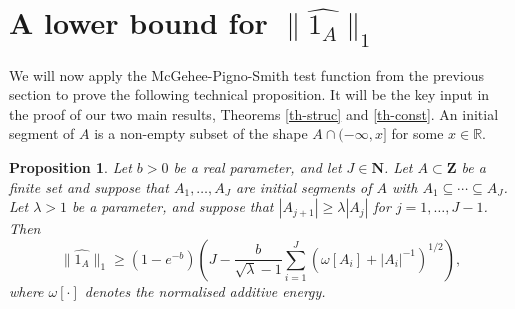 \documentclass[reqno]{amsart}
\newcommand{\anorm}[1]{\| \widehat{#1}\|}
\renewcommand{\geq}{\geqslant}
\newcommand{\ind}[1]{1_{#1}}
\newcommand{\bbn}{\mathbf{N}}
\newcommand{\bbz}{\mathbf{Z}}
\newcommand{\abs}[1]{\left\lvert #1\right\rvert}
\newcommand{\brac}[1]{\left( #1\right)}
\numberwithin{equation}{section}
\newtheorem{proposition}[theorem]{Proposition}
\theoremstyle{definition}
\theoremstyle{remark}
\begin{document}
\section{A lower bound for $\anorm{1_A}_1$}

We will now apply the McGehee-Pigno-Smith test function from the previous section to prove the following technical proposition. It will be the key input in the proof of our two main results, Theorems \ref{th-struc} and \ref{th-const}. An initial segment of $A$ is a non-empty subset of the shape $A\cap (-\infty,x]$ for some $x\in \mathbb{R}$.


\begin{proposition}\label{prop-litt}
Let $b > 0$ be a real parameter, and let $J \in \bbn$. Let $A\subset\bbz$ be a finite set and suppose that $A_1,\dots, A_J$ are initial segments of $A$ with $A_1 \subseteq \cdots \subseteq A_J$. Let $\lambda > 1$ be a parameter, and suppose that $\abs{A_{j+1}}\geq \lambda \abs{A_{j}}$ for $j = 1,\dots, J-1$. Then
\[\anorm{\ind{A}}_1\geq (1-e^{-b})\brac{J- \frac{b}{\sqrt{\lambda} - 1}  \sum_{i = 1}^J(\omega[A_i]+\abs{A_i}^{-1})^{1/2}},\]
where $\omega[ \cdot]$ denotes the normalised additive energy. 
\end{proposition}
\end{document}
